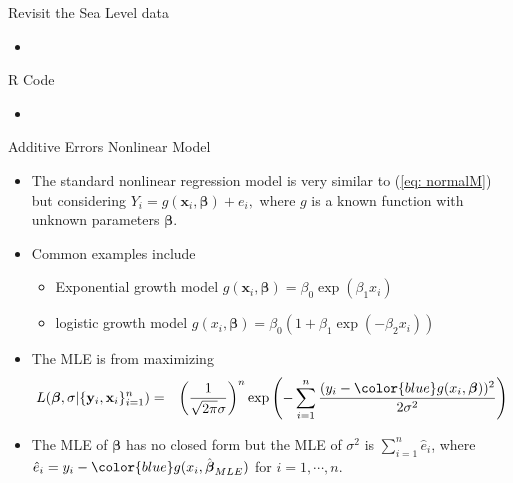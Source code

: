 \documentclass{beamer}
\begin{document}
        \begin{frame}{Revisit the Sea Level data}
        \begin{itemize}
          \item
        \end{itemize}
    \end{frame}
    
    
            \begin{frame}{R Code}
        \begin{itemize}
           \item
        \end{itemize}
    \end{frame}
    



    \begin{frame}{Additive Errors Nonlinear Model}
        \begin{itemize}
            \item The standard nonlinear regression model is very similar to (\ref{eq: normalM}) but considering $Y_{i} = g(\mathbf{x}_{i}, \boldsymbol{\beta}) + e_{i},$
            where $g$ is a known function with unknown parameters $\boldsymbol{\beta}$.
            \item Common examples include 
            \begin{itemize}
                \item Exponential growth model $g(\mathbf{x}_{i}, \boldsymbol{\beta}) = \beta_{0}\exp(\beta_{1}x_{i})$
                \item logistic growth model $g(x_{i}, \boldsymbol{\beta}) = \beta_{0}(1+\beta_{1}\exp(-\beta_{2}x_{i}))$
            \end{itemize}
            \item The MLE is from maximizing
             \begin{eqnarray}
                L(\boldsymbol{\beta}, \sigma |\{\mathbf{y}_{i}, \mathbf{x}_{i}\}^{n}_{i=1}) 
                & = & \left(\frac{1}{\sqrt{2\pi}\sigma}\right)^{n}\exp\left(-\sum^{n}_{i=1}\frac{(y_{i}-{{\color{blue} g(x_{i}, \boldsymbol{\beta}})})^2}{2\sigma^2}\right) \nonumber
            \end{eqnarray}
            \item The MLE of $\boldsymbol{\beta}$ has no closed form but the MLE of $\sigma^2$ is  
            $\sum^{n}_{i=1} \hat{e}_{i}$,
            where $\hat{e}_{i} = y_{i} - \color{blue} g(x_{i}, \hat{\boldsymbol{\beta}}_{MLE})$ for $i = 1, \cdots, n.$
        \end{itemize}
    \end{frame}
    
\end{document}
